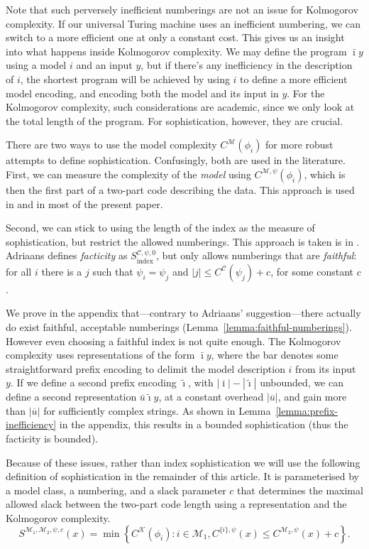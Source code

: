 \documentclass{style/llncs}
\newcommand{\M}{\mathscr M}
\newcommand{\C}{\mathscr C}
\newcommand{\K}{\mathscr K}
\newcommand{\br}[1]{\overline{#1}}
\newcommand{\s}{S}
\newcommand{\bi}{\bar\imath}
\begin{document}
Note that such perversely inefficient numberings are not an issue for Kolmogorov complexity. If our universal Turing machine uses an inefficient numbering, we can switch to a more efficient one at only a constant cost. This gives us an insight into what happens inside Kolmogorov complexity. We may define the program $\bi y$ using a model $i$ and an input $y$, but if there's any inefficiency in the description of $i$, the shortest program will be achieved by using $i$ to define a more efficient model encoding, and encoding both the model and its input in $y$. For the Kolmogorov complexity, such considerations are academic, since we only look at the total length of the program. For sophistication, however, they are crucial.

There are two ways to use the model complexity $C^\M(\phi_i)$ for more robust attempts to define sophistication. Confusingly, both are used in the literature. First, we can measure the complexity of the \emph{model} using $C^{\M,\psi}(\phi_i)$, which is then the first part of a two-part code describing the data. This approach is used in  \cite{cover1985kolmogorov,gacs2001algorithmic,vitanyi2004meaningful,gellmann1996information} and in most of the present paper.

Second, we can stick to using the length of the index as the measure of sophistication, but restrict the allowed numberings. This approach is taken is in \cite{adriaans2012facticity}. Adriaans  defines \emph{facticity} as $\s_\text{index}^{\C,\psi,0}$, but only allows numberings that are \emph{faithful}: for all $i$ there is a $j$ such that $\psi_i=\psi_j$ and $|j|\le C^{\C}(\psi_j)+c$, for some constant $c$.

We prove in the appendix that---contrary to Adriaans' suggestion---there actually do exist faithful, acceptable numberings (Lemma~\ref{lemma:faithful-numberings}). However even choosing a faithful index is not quite enough. The Kolmogorov complexity uses representations of the form $\bar\imath y$, where the bar denotes some straightforward prefix encoding to delimit the model description $i$ from its input $y$. If we define a second prefix encoding $\tilde{\imath}$, with $|\bar\imath|-|\tilde\imath|$ unbounded, we can define a second representation $\bar u \tilde \imath y$, at a constant overhead $|\br{u}|$, and gain more than $|\br{u}|$ for sufficiently complex strings. As shown in Lemma~\ref{lemma:prefix-inefficiency} in the appendix, this results in a bounded sophistication (thus the facticity is bounded). 

Because of these issues, rather than index sophistication we will use the following definition of sophistication in the remainder of this article. It is parameterised by a model class, a numbering, and a slack parameter $c$ that determines the maximal allowed slack between the two-part code length using a representation and the Kolmogorov complexity.
\[
\s^{\M_1,\M_2,\psi,c}(x)=\min\left\{C^\K(\phi_i):i\in\M_1,C^{\{i\},\psi}(x)\le C^{\M_2,\psi}(x)+c\right\}.
\]
\end{document}
